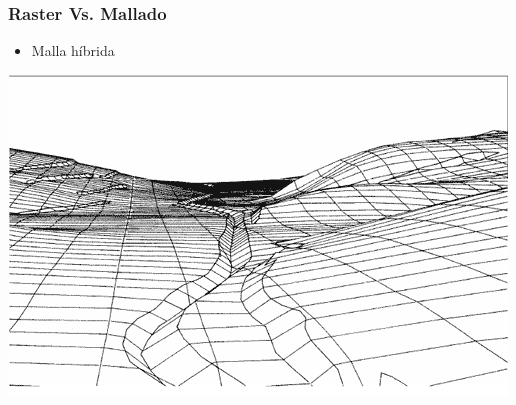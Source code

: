 \begin{frame}
  \frametitle{Raster Vs. Mallado}
  \begin{itemize}
    \item Malla híbrida 
  \end{itemize}
  \begin{center}
        \includegraphics[height=0.60\textheight]{images/malla_breaklines}
  \end{center}
\end{frame}
